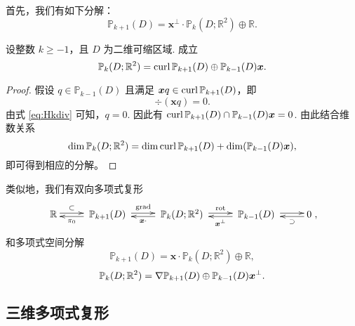首先，我们有如下分解：
\[
\mathbb P_{k+1}(D) = \boldsymbol x^{\perp}\cdot\mathbb P_k(D;\mathbb R^2)\oplus\mathbb R.
\]

\begin{lemma}\label{lem:symmpolyspacedirectsum}
设整数 $k\geq-1$，且 $D$ 为二维可缩区域.
成立
 \begin{equation}\label{eq:vector2polyspacedecomp2}
\mathbb P_{k}(D;\mathbb R^2)=\operatorname{curl}\mathbb P_{k+1}(D)\oplus\mathbb P_{k-1}(D)\boldsymbol x.
\end{equation}
\end{lemma}
\begin{proof}
假设 $q\in\mathbb P_{k-1}(D)$ 且满足 $\boldsymbol xq\in\operatorname{curl}\mathbb P_{k+1}(D)$，即
\[
\div(\boldsymbol  xq)=0.
\]
由式 \eqref{eq:Hkdiv} 可知，$q=0$.
因此有
$\operatorname{curl}\mathbb P_{k+1}(D)\cap\mathbb P_{k-1}(D)\boldsymbol x=0$. 
由此结合维数关系
\[
\dim \mathbb P_k(D;\mathbb R^2) = \dim \operatorname{curl} \mathbb P_{k+1}(D) + \dim (\mathbb P_{k-1}(D)\boldsymbol x),
\]
即可得到相应的分解。
\end{proof}

类似地，我们有双向多项式复形
\begin{equation*}
\xymatrix{
\mathbb R\ar@<0.4ex>[r]^-{\subset} & \; \mathbb P_{k+1}(D)\; \ar@<0.4ex>[r]^-{\grad}\ar@<0.4ex>[l]^-{\pi_0}  & \; \mathbb P_k(D;\mathbb R^2) \ar@<0.4ex>[r]^-{\rot}\; \ar@<0.4ex>[l]^-{\boldsymbol x\cdot} & \; \mathbb P_{k-1}(D)  \; \ar@<0.4ex>[r]^-{} \ar@<0.4ex>[l]^-{\boldsymbol x^{\bot}}
& 0 \ar@<0.4ex>[l]^-{\supset} },
\end{equation*}
和多项式空间分解
\[
\mathbb P_{k+1}(D) = \boldsymbol x\cdot\mathbb P_k(D;\mathbb R^2)\oplus\mathbb R,
\]
\[
\mathbb P_{k}(D;\mathbb R^2)=\nabla\mathbb P_{k+1}(D)\oplus\mathbb P_{k-1}(D)\boldsymbol x^{\perp}.
\]


\subsection{三维多项式复形}


